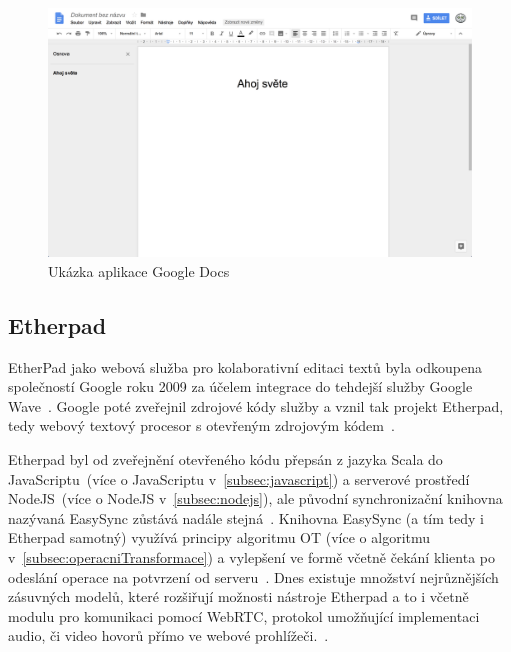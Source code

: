\begin{figure}[ht]
    \centering
    \includegraphics[width=\textwidth]{partials/analyza/googleDocs}
    \caption{Ukázka aplikace Google Docs}\label{fig:googleDocs}
\end{figure}

\subsection{Etherpad}\label{subsec:etherpad}

EtherPad jako webová služba pro kolaborativní editaci textů byla odkoupena společností Google roku 2009 za účelem integrace do tehdejší služby Google Wave~\cite{etherpad:acquired}.
Google poté zveřejnil zdrojové kódy služby a vznil tak projekt Etherpad, tedy webový textový procesor s otevřeným zdrojovým kódem~\cite{etherpad:openSource}.

Etherpad byl od zveřejnění otevřeného kódu přepsán z jazyka Scala do JavaScriptu~(více o JavaScriptu v~\ref{subsec:javascript}) a serverové prostředí NodeJS~(více o NodeJS v~\ref{subsec:nodejs}), ale původní synchronizační knihovna nazývaná EasySync zůstává nadále stejná~\cite{etherpad:newgithub, etherpad:easySync}.
Knihovna EasySync (a tím tedy i Etherpad samotný) využívá principy algoritmu \gls{OT} (více o algoritmu v~\ref{subsec:operacniTransformace}) a vylepšení ve formě včetně čekání klienta po odeslání operace na potvrzení od serveru~\cite{etherpad:easySync}.
Dnes existuje množství nejrůznějších zásuvných modelů, které rozšiřují možnosti nástroje Etherpad a to i včetně modulu pro komunikaci pomocí \gls{WebRTC}, protokol umožňující implementaci audio, či video hovorů přímo ve webové prohlížeči.~\cite{etherpad:plugins}.

